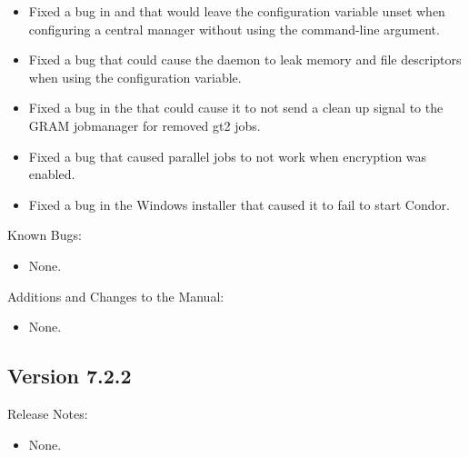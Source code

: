 \begin{itemize}
\item Fixed a bug in  and  that would
  leave the configuration variable  unset when
  configuring a central manager without using the 
  command-line argument.

\item Fixed a bug that could cause the  daemon
  to leak memory and file descriptors when using the
   configuration variable.

\item Fixed a bug in the  that could cause it to
not send a clean up signal to the GRAM jobmanager for removed gt2 jobs.

\item Fixed a bug that caused parallel jobs to not work when
encryption was enabled.

\item Fixed a bug in the Windows installer that caused it to fail to start
Condor.

\end{itemize}

\noindent Known Bugs:

\begin{itemize}

\item None.

\end{itemize}

\noindent Additions and Changes to the Manual:

\begin{itemize}

\item None.

\end{itemize}



\subsection*{\label{sec:New-7-2-2}Version 7.2.2}

\noindent Release Notes:

\begin{itemize}

\item None.

\end{itemize}


